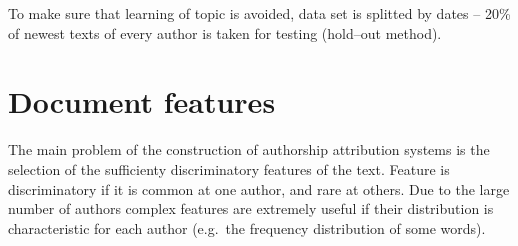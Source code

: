 \documentclass[11pt,english]{article}
\begin{document}
\begin{multicols}{2}
To make sure that learning of topic is avoided, data set is splitted by dates
-- 20\% of newest texts of every author is taken for testing (hold--out method).


\begin{minipage}{0.8\linewidth}
\vspace{10pt}
\centerline{\resizebox{1.4\linewidth}{!}{}}%
%
\label{fig:articlesPerAuthor}
\end{minipage}



\section{Document features}
The main problem of the construction of authorship attribution systems is the
selection of the sufficienty discriminatory features of the text. Feature is
discriminatory if it is common at one author, and rare at others. Due to the
large number of authors complex features are extremely useful if their
distribution is characteristic for each author (e.g.\ the frequency distribution
of some words).


\end{multicols}
\end{document}

